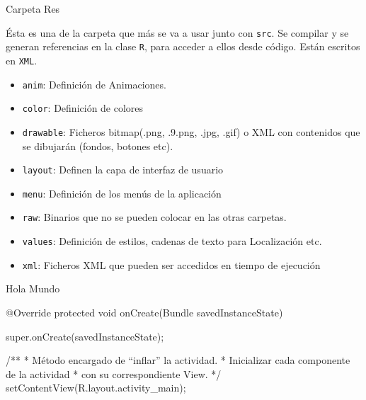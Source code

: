 \begin{frame}{Carpeta Res}
\begin{block}{}
Ésta es una de la carpeta que más se va a usar junto con \texttt{src}. Se compilar y se generan referencias en la clase \texttt{R}, para acceder a ellos desde código. Están escritos en \texttt{XML}.
\pause
\end{block}
\begin{itemize}
    \item<2-> \texttt{anim}: Definición de Animaciones.
    \item<3-> \texttt{color}: Definición de colores
    \item<4-> \texttt{drawable}: Ficheros bitmap(.png, .9.png, .jpg, .gif) o XML con contenidos que se dibujarán (fondos, botones etc).
    \item<5-> \texttt{layout}: Definen la capa de interfaz de usuario
    \item<6-> \texttt{menu}: Definición de los menús de la aplicación
    \item<7-> \texttt{raw}: Binarios que no se pueden colocar en las otras carpetas.
    \item<8-> \texttt{values}: Definición de estilos, cadenas de texto para Localización etc.
    \item<9-> \texttt{xml}: Ficheros XML que pueden ser accedidos en tiempo de ejecución
\end{itemize}
\end{frame}

\begin{frame}[fragile]{Hola Mundo}
\begin{block}{}
\begin{javacode}
    @Override
    protected void onCreate(Bundle savedInstanceState) {
        super.onCreate(savedInstanceState);

        /**
         * Método encargado de “inflar” la actividad.
         * Inicializar cada componente de la actividad
         * con su correspondiente View.
         */
        setContentView(R.layout.activity_main);
    }
\end{javacode}
\end{block}
\end{frame}

